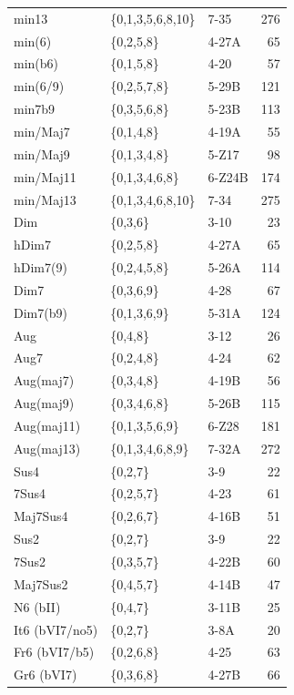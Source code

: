 \documentclass{article}
\begin{document}
\begin{table}[htb]
\begin{center}
\begin{tabular}{lllr}
 min13           &  \{0,1,3,5,6,8,10\}  &  7-35    &  276  \\
 min(6)          &  \{0,2,5,8\}         &  4-27A   &   65  \\
 min(b6)         &  \{0,1,5,8\}         &  4-20    &   57  \\
 min(6/9)        &  \{0,2,5,7,8\}       &  5-29B   &  121  \\
 min7b9          &  \{0,3,5,6,8\}       &  5-23B   &  113  \\
\hline
 min/Maj7        &  \{0,1,4,8\}         &  4-19A   &   55  \\
 min/Maj9        &  \{0,1,3,4,8\}       &  5-Z17   &   98  \\
 min/Maj11       &  \{0,1,3,4,6,8\}     &  6-Z24B  &  174  \\
 min/Maj13       &  \{0,1,3,4,6,8,10\}  &  7-34    &  275  \\
\hline
 Dim             &  \{0,3,6\}           &  3-10    &   23  \\
 hDim7           &  \{0,2,5,8\}         &  4-27A   &   65  \\
 hDim7(9)        &  \{0,2,4,5,8\}       &  5-26A   &  114  \\
 Dim7            &  \{0,3,6,9\}         &  4-28    &   67  \\
 Dim7(b9)        &  \{0,1,3,6,9\}       &  5-31A   &  124  \\
\hline
 Aug             &  \{0,4,8\}           &  3-12    &   26  \\
 Aug7            &  \{0,2,4,8\}         &  4-24    &   62  \\
 Aug(maj7)       &  \{0,3,4,8\}         &  4-19B   &   56  \\
 Aug(maj9)       &  \{0,3,4,6,8\}       &  5-26B   &  115  \\
 Aug(maj11)      &  \{0,1,3,5,6,9\}     &  6-Z28   &  181  \\
 Aug(maj13)      &  \{0,1,3,4,6,8,9\}   &  7-32A   &  272  \\
\hline
 Sus4            &  \{0,2,7\}           &  3-9     &   22  \\
 7Sus4           &  \{0,2,5,7\}         &  4-23    &   61  \\
 Maj7Sus4        &  \{0,2,6,7\}         &  4-16B   &   51  \\
 Sus2            &  \{0,2,7\}           &  3-9     &   22  \\
 7Sus2           &  \{0,3,5,7\}         &  4-22B   &   60  \\
 Maj7Sus2        &  \{0,4,5,7\}         &  4-14B   &   47  \\
\hline
 N6 (bII)        &  \{0,4,7\}           &  3-11B   &   25  \\
 It6 (bVI7/no5)  &  \{0,2,7\}           &  3-8A    &   20  \\
 Fr6 (bVI7/b5)   &  \{0,2,6,8\}         &  4-25    &   63  \\
 Gr6 (bVI7)      &  \{0,3,6,8\}         &  4-27B   &   66  \\
\hline
\end{tabular}
\end{center}
\end{table}
\end{document}
